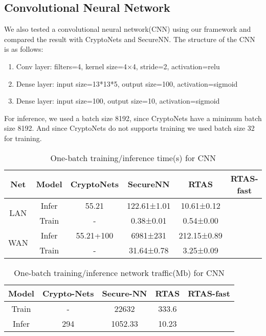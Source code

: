 \subsection{Convolutional Neural Network}
We also tested a convolutional neural network(CNN) using our framework and compared the result with CryptoNets\cite{bachrach2016cryptonets} and SecureNN\cite{wagh2019securenn}. The structure of the CNN is as follows:
\begin{enumerate}
    \item Conv layer: filters=4, kernel size=4×4, stride=2, activation=relu
    \item Dense layer: input size=13*13*5, output size=100, activation=sigmoid
    \item Dense layer: input size=100, output size=10, activation=sigmoid
\end{enumerate}

For inference, we used a batch size 8192, since CryptoNets have a minimum batch size 8192. And since CryptoNets do not supports training we used batch size 32 for training.

\begin{table}[htbp]
    \small
    \caption{One-batch training/inference time(s) for CNN}
    \begin{center}
    \begin{tabular}{|c|c|c|c|c|c|}
    \hline
    Net& Model & CryptoNets & SecureNN & RTAS & RTAS-fast \\
    \hline
    \multirow{2}{*}{LAN} & Infer & 55.21 & 122.61±1.01 & 10.61±0.12  & \\
    \cline{2-6}
     & Train & - & 0.38±0.01 & 0.54±0.00 & \\
    \hline
    \multirow{2}{*}{WAN} & Infer & 55.21+100 & 6981±231 & 212.15±0.89 & \\
    \cline{2-6}
     & Train & - & 31.64±0.78 & 3.25±0.09 & \\
    \hline
    \end{tabular}
    \label{table:eta-cnn}
    \end{center}
\end{table}

\begin{table}[htbp]
    \caption{One-batch training/inference network traffic(Mb) for CNN}
    \begin{center}
    \begin{tabular}{|c|C{4.5}|C{4.5}|C{4.5}|C{4.5}|}
    \hline
     Model & Crypto-Nets & Secure-NN & RTAS & RTAS-fast \\
    \hline
     Train & - & 22632 & 333.6 & \\
    \hline
     Infer & 294 & 1052.33 & 10.23 & \\
    \hline
    \end{tabular}
    \label{table:traffic-cnn}
    \end{center}
\end{table}